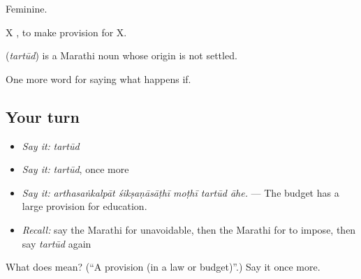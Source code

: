 Feminine.

X   , to make provision for X.

\begin{cousinweb}
\textbf{} (\emph{tartūd}) is a Marathi noun whose origin is not settled.
\end{cousinweb}

\begin{grammarlens}[title={What you've built}]
One more word for saying what happens if.
\end{grammarlens}

\subsection*{Your turn}
\begin{itemize}
\raggedright
  \item \emph{Say it:} \emph{tartūd}
  \item \emph{Say it:} \emph{tartūd}, once more
  \item \emph{Say it:} \emph{arthasaṅkalpāt śikṣaṇāsāṭhī moṭhī tartūd āhe.} — The budget has a large provision for education.
  \item \emph{Recall:} say the Marathi for unavoidable, then the Marathi for to impose, then say \emph{tartūd} again
\end{itemize}

\begin{tcolorbox}[breakable,colback=teal!4,colframe=teal!35!black,title={Before you move on}]
What does  mean? (\textquotedblleft{}A provision (in a law or budget)\textquotedblright{}.) Say it once more.
\end{tcolorbox}

